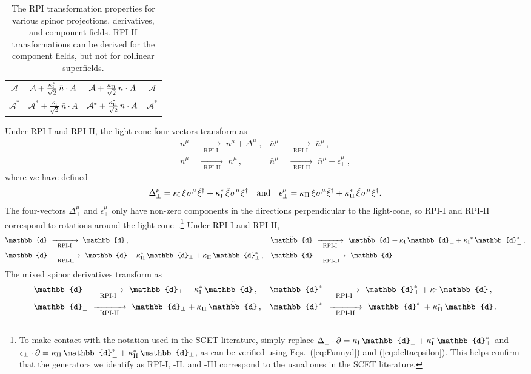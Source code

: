 \documentclass[12pt,document,nofootinbib,superscriptaddress,onecolumn,preprintnumbers,balancelastpage]{article}
\newcommand{\rpii}{{\kappa_\text{I}}}
\newcommand{\s}{\hspace{0.8pt}}
\newcommand{\PP}{\mathbb{d}}
\newcommand{\RPIi}{\,\,\xrightarrow[\hspace{5pt}\text{RPI-I}\hspace{5pt}]{}\,\,}
\newcommand{\RPIii}{\,\,\xrightarrow[\hspace{5pt}\text{RPI-II}\hspace{5pt}]{}\,\,}
\DeclareRobustCommand{\Eqs}[2]{Eqs.~(\ref{#1}) and (\ref{#2})}
\newcommand{\alc}{\mathcal{A}}
\begin{document}
\begin{spacing}{1.2}
\begin{table}[t!]
\begin{tabular}{ |c || c | c | c|}
  $\alc  $ &  $\alc+\frac{\kappa_{\rm I}^*}{\sqrt{2}} \,\bar n \cdot A$     &  $\alc + \frac{\kappa_{\rm II}}{\sqrt{2}} \, n\cdot A$ &  $\alc$  \\
$\alc^*  $ &  $\alc^*+\frac{\rpii}{\sqrt{2}}\, \bar n\cdot A$  & $\alc^* + \frac{\kappa_{\rm II}^*}{\sqrt{2}} \,n\cdot A $ & $\alc^*$  \\
\hline
\end{tabular}
% 
\caption{\small{The RPI transformation properties for various spinor projections, derivatives, and component fields.  RPI-II transformations can be derived for the component fields, but not for collinear superfields. }
\label{table:RPI-components}}
\end{table}


Under RPI-I and RPI-II, the light-cone four-vectors transform as 
\begin{align}
n^\mu &\RPIi n^\mu + \Delta_\perp^\mu \,, &  \bar{n}^\mu &\RPIi \bar{n}^\mu\,,\\[5pt]
 n^\mu &\RPIii n^\mu\,, & \bar{n}^\mu &\RPIii \bar{n}^\mu  + \epsilon^\mu_\perp\,, \label{eq:RPI2_nn}
\end{align}
where we have defined
\begin{align}
\label{eq:deltaepsilon}
\Delta^\mu_\perp = \kappa_{\rm I} \, \xi\s \sigma^\mu\s \tilde{\xi}^\dagger + \kappa_{\rm I}^* \, \tilde{\xi} \s \sigma^\mu\s \xi^\dagger \quad \text{and} \quad \epsilon^\mu_\perp = \kappa_{\rm II} \,  \xi \s\sigma^\mu \s\tilde{\xi}^\dagger + \kappa_{\rm II}^* \, \tilde{\xi}\s \sigma^\mu\s \xi^\dagger. 
\end{align}
%
The four-vectors $\Delta_\perp^\mu$ and $\epsilon_\perp^\mu$ only have non-zero components in the directions perpendicular to the light-cone, so RPI-I and RPI-II correspond to rotations around the light-cone~\cite{Marcantonini:2008qn}.\footnote{To make contact with the notation used in the SCET literature, simply replace $\Delta_\perp \cdot \partial =   \kappa_{\rm I}\, \PP_\perp + \kappa_{\rm I}^* \,\PP_\perp^* $ and  $\epsilon_\perp \cdot \partial =  \kappa_{\rm II}\, \PP_\perp^* + \kappa_{\rm II}^*\, \PP_\perp $, as can be verified using \Eqs{eq:Funnyd}{eq:deltaepsilon}.  This helps confirm that the generators we identify as RPI-I, -II, and -III correspond to the usual ones in the SCET literature.}
%
Under RPI-I and RPI-II, 
\begin{align}
\PP &\RPIi \PP \,,  & \tilde{\PP} &\RPIi \tilde{\PP} + \rpii\, \PP_\perp + \rpii^*\, \PP^*_\perp\, , \\
\PP &\RPIii\PP + \kappa_{\rm II}^*\, \PP_\perp + \kappa_{\rm II} \,\PP_\perp^* \,, & \tilde{\PP} &\RPIii \tilde{\PP} \,.
\end{align}
%
The mixed spinor derivatives transform as
%
\begin{align}
\PP_\perp &\RPIi \PP_\perp + \kappa_{\rm I}^*\, \PP \,,  & \PP_\perp^* & \RPIi \PP_\perp^*  + \kappa_{\rm I}\, \PP \,, \\
 \PP_\perp &\RPIii \PP_\perp  + \kappa_{\rm II}\, \tilde{\PP} \, , & \PP_\perp^* &\RPIii \PP_\perp^* +  \kappa_{\rm II}^*\, \tilde{\PP} \,.
\end{align} 
%



\end{spacing}
\end{document}

